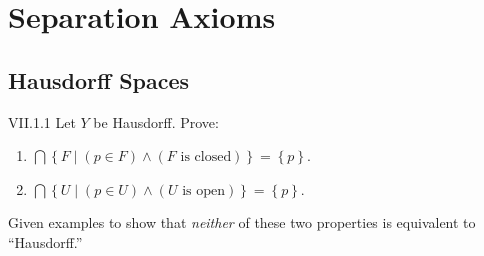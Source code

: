 \chapter{Separation Axioms}

\section{Hausdorff Spaces}

\begin{problem}{VII.1.1}
Let \( Y \) be Hausdorff. Prove:
\begin{enumerate}[label={(\alph*)}]
	\item \( \bigcap \left\{ F \mid (p \in F) \land (F\text{ is closed}) \right\} = \left\{ p \right\} \).
	\item \( \bigcap \left\{ U \mid (p \in U) \land (U\text{ is open}) \right\} = \left\{ p \right\} \).
\end{enumerate}

Given examples to show that \textit{neither} of these two properties is equivalent to ``Hausdorff.\@''
\end{problem}

